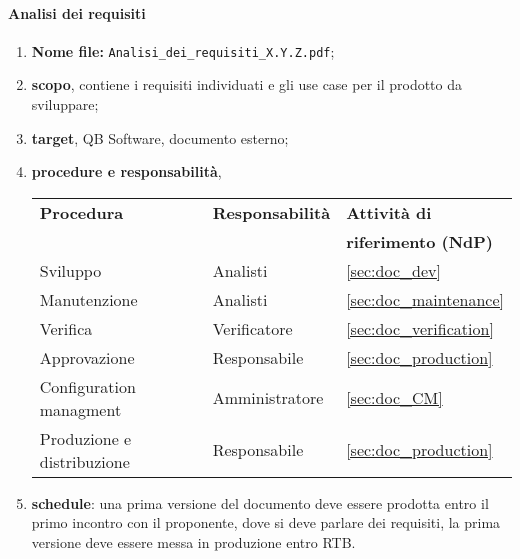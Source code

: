         \paragraph{Analisi dei requisiti}
            \begin{enumerate}
                \item \textbf{Nome file:} \texttt{Analisi\_dei\_requisiti\_X.Y.Z.pdf};
                \item \textbf{scopo}, contiene i requisiti individuati e gli use case per il prodotto da sviluppare;
                \item \textbf{target}, QB Software, documento esterno;
                \item \textbf{procedure e responsabilità},
                    \newline
                    \begin{tabularx}{0.93\textwidth}{|X|X|X|}
                        \hline
                        \textbf{Procedura} & \textbf{Responsabilità} & \textbf{Attività di} \\
                        & & \textbf{riferimento (NdP)} \\
                        \hline
                        Sviluppo & Analisti & \ref{sec:doc_dev}
                        \\\hline
                        Manutenzione & Analisti & \ref{sec:doc_maintenance}
                        \\\hline
                        Verifica & Verificatore & \ref{sec:doc_verification}
                        \\\hline
                        Approvazione & Responsabile & \ref{sec:doc_production}
                        \\\hline
                        Configuration managment & Amministratore & \ref{sec:doc_CM}
                        \\\hline
                        Produzione e distribuzione & Responsabile & \ref{sec:doc_production}
                        \\\hline
                    \end{tabularx}
                \item \textbf{schedule}: una prima versione del documento deve essere prodotta entro il primo incontro con il proponente, dove si deve parlare dei requisiti, la prima versione deve essere messa in produzione entro RTB.
            \end{enumerate} 

